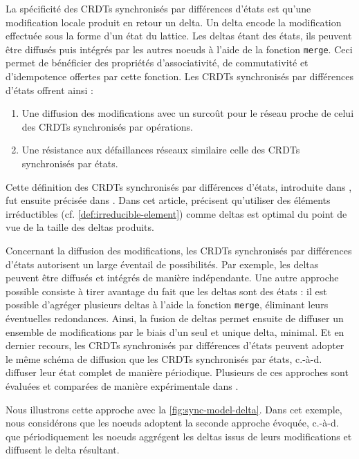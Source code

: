 \documentclass[12pt]{thesul}
\newcommand{\ie}{c.-à-d. }
\begin{document}
La spécificité des \acp{CRDT} synchronisés par différences d'états est qu'une modification locale produit en retour un delta.
Un delta encode la modification effectuée sous la forme d'un état du lattice.
Les deltas étant des états, ils peuvent être diffusés puis intégrés par les autres noeuds à l'aide de la fonction \texttt{merge}.
Ceci permet de bénéficier des propriétés d'associativité, de commutativité et d'idempotence offertes par cette fonction.
Les \acp{CRDT} synchronisés par différences d'états offrent ainsi :
\begin{enumerate}[label=(\roman*)]
  \item Une diffusion des modifications avec un surcoût pour le réseau proche de celui des \acp{CRDT} synchronisés par opérations.
  \item Une résistance aux défaillances réseaux similaire celle des \acp{CRDT} synchronisés par états.
\end{enumerate}

Cette définition des \acp{CRDT} synchronisés par différences d'états, introduite dans \cite{almeida2015delta,Almeida_2018}, fut ensuite précisée dans \cite{enes2019}.
Dans cet article, \citeauthor{enes2019} précisent qu'utiliser des éléments irréductibles (cf. \autoref{def:irreducible-element}) comme deltas est optimal du point de vue de la taille des deltas produits.

Concernant la diffusion des modifications, les \acp{CRDT} synchronisés par différences d'états autorisent un large éventail de possibilités.
Par exemple, les deltas peuvent être diffusés et intégrés de manière indépendante.
Une autre approche possible consiste à tirer avantage du fait que les deltas sont des états : il est possible d'agréger plusieurs deltas à l'aide la fonction \texttt{merge}, éliminant leurs éventuelles redondances.
Ainsi, la fusion de deltas permet ensuite de diffuser un ensemble de modifications par le biais d'un seul et unique delta, minimal.
Et en dernier recours, les \acp{CRDT} synchronisés par différences d'états peuvent adopter le même schéma de diffusion que les \acp{CRDT} synchronisés par états, \ie diffuser leur état complet de manière périodique.
Plusieurs de ces approches sont évaluées et comparées de manière expérimentale dans \cite{enes2019}.

Nous illustrons cette approche avec la \autoref{fig:sync-model-delta}.
Dans cet exemple, nous considérons que les noeuds adoptent la seconde approche évoquée, \ie que périodiquement les noeuds aggrégent les deltas issus de leurs modifications et diffusent le delta résultant.
\end{document}
